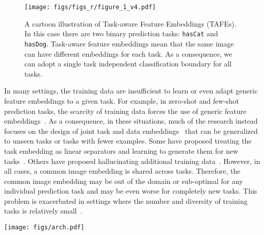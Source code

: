 \documentclass[10pt,twocolumn,letterpaper]{article}
\newcommand{\model}{TAFE-Net\xspace}
\begin{document}
\begin{figure}[t]
	\centering
	\texttt{[image: figs/figs\_r/figure\_1\_v4.pdf]} \caption{A cartoon illustration of Task-aware Feature Embeddings (TAFEs). In this case there are two binary prediction tasks: \texttt{hasCat} and \texttt{hasDog}.
		Task-aware feature embeddings mean that the same image can have different embeddings for each task.
		As a consequence, we can adopt a single task independent classification boundary for all tasks.\vspace{-1em}}
	\label{fig:tafe}
\end{figure}

In many settings, the training data are insufficient to learn or even adapt generic feature embeddings to a given task.
For example, in zero-shot and few-shot prediction tasks, the scarcity of training data forces the use of generic feature embeddings~\cite{lampert2014attribute,xian2018zero,zhang2016zero}.
As a consequence, in these situations, much of the research instead focuses on the design of joint task and data embeddings~\cite{Changpinyo_2016_CVPR,frome2013devise,zhang2016zero} that can be generalized to unseen tasks or tasks with fewer examples. 
Some have proposed treating the task embedding as linear separators and learning to generate them for new tasks~\cite{vinyals2016matching,lu2016visual}. 
Others have proposed hallucinating additional training data~\cite{xian2018feature,hariharan2017low, wang2018low}. 
However, in all cases, a common image embedding is shared across tasks. Therefore, the common image embedding may be out of the domain or sub-optimal for any individual prediction task and may be even worse for completely 
new tasks. This problem is exacerbated in settings where the number and diversity of training tasks is relatively small~\cite{finn2017one}.

\begin{figure*}[t]
	\centering
	\texttt{[image: figs/arch.pdf]}
	\caption{\model architecture design. \model has
		a task-aware meta learner that generates the parameters of
		the feature layers within the classification subnetwork to transform the generic image features to TAFEs. The generated weights are
		factorized into low-dimensional task-specific weights and 
		high-dimensional shared weights across all tasks to reduce the complexity of the parameter generation. A single 
		classifier is shared across all tasks taking the resulting TAFEs as inputs.\vspace{-1em}}
	\label{fig:model_arch}
\end{figure*}
\end{document}
